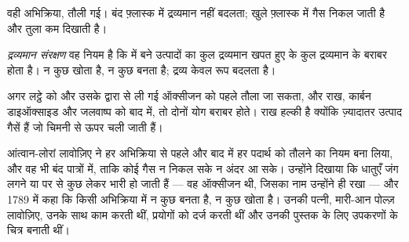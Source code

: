 \begin{omfigure}

{\small वही अभिक्रिया, तौली गई। बंद फ़्लास्क में द्रव्यमान नहीं बदलता; खुले
फ़्लास्क में गैस निकल जाती है और तुला कम
दिखाती है।}
\end{omfigure}

\begin{definition}[द्रव्यमान संरक्षण]\label{def:g8:balanced-equations:conservation}
\emph{द्रव्यमान संरक्षण} वह नियम है कि
 में बने उत्पादों का कुल द्रव्यमान खपत हुए  के कुल
द्रव्यमान के बराबर होता है। न कुछ खोता है, न कुछ
बनता है; द्रव्य केवल रूप बदलता है।
\end{definition}

\begin{example}[लट्ठा, ठीक से तौला गया]\label{ex:g8:balanced-equations:log}
अगर  लट्ठे को और उसके द्वारा  से ली गई ऑक्सीजन को पहले तौला जा
सकता, और राख, कार्बन डाइऑक्साइड और जलवाष्प को बाद में, तो दोनों योग बराबर
होते। राख हल्की है क्योंकि ज़्यादातर उत्पाद गैसें हैं जो चिमनी से ऊपर
चली जाती हैं।
\end{example}

\begin{history}[लावोज़िए सब कुछ तौलते हैं, 1770 का दशक--1789]
आंत्वान-लोरां लावोज़िए ने हर अभिक्रिया से पहले और बाद में हर पदार्थ को तौलने
का नियम बना लिया, और वह भी बंद पात्रों में, ताकि कोई गैस न निकल सके न
अंदर आ सके। उन्होंने दिखाया कि धातुएँ जंग लगने या  पर  से कुछ लेकर
भारी हो जाती हैं --- वह ऑक्सीजन थी, जिसका नाम उन्होंने ही रखा --- और 1789 में
कहा कि किसी अभिक्रिया में न कुछ बनता है, न कुछ खोता है। उनकी पत्नी,
मारी-आन पोल्ज़ लावोज़िए, उनके साथ काम करती थीं, प्रयोगों को दर्ज करती थीं
और उनकी पुस्तक के लिए उपकरणों के चित्र बनाती थीं।
\end{history}

